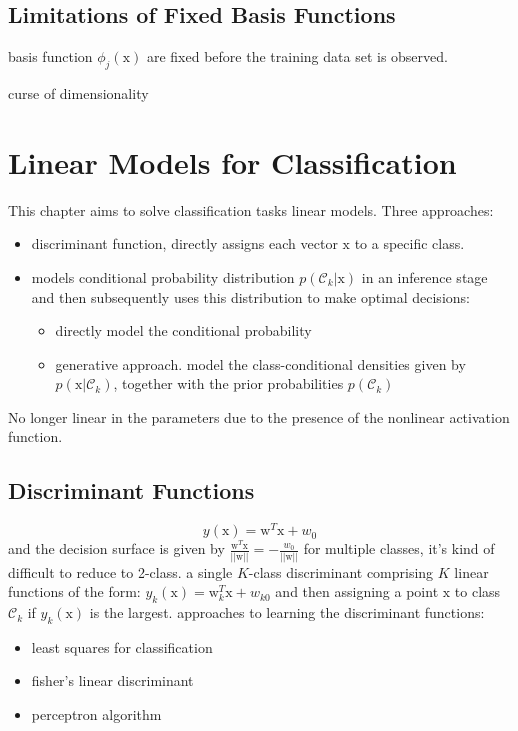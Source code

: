 \documentclass[a4paper]{book}
\begin{document}
\subsection{Limitations of Fixed Basis Functions}
basis function $\phi_j(\mathrm x)$ are fixed before the training data set is observed.\newline

curse of dimensionality




\section{Linear Models for Classification}
This chapter aims to solve classification tasks linear models.\newline
Three approaches:
\begin{itemize}
  \item discriminant function, directly assigns each vector $\mathrm x$ to a specific class.
  \item models conditional probability distribution $p(\mathcal C_k|\mathrm x)$ in an inference stage and then subsequently uses this distribution to make optimal decisions:
      \begin{itemize}
        \item directly model the conditional probability
        \item generative approach. model the class-conditional densities given by $p(\mathrm x|\mathcal C_k)$, together with the prior probabilities $p(\mathcal C_k)$
      \end{itemize}
\end{itemize}
No longer linear in the parameters due to the presence of the nonlinear activation function.
\subsection{Discriminant Functions}
$$y(\mathrm x) = \mathrm w^T\mathrm x+w_0$$
and the decision surface is given by $\frac{\mathrm w^T\mathrm x}{||\mathrm w||} = -\frac{w_0}{||\mathrm w||}$
for multiple classes,  it's kind of difficult to reduce to 2-class. a single $K$-class discriminant comprising $K$ linear functions of the form:
$y_k(\mathrm x) = \mathrm w_k^T\mathrm x+w_{k0}$ and then assigning a point $\mathrm x$ to class $\mathcal C_k$ if $y_k(\mathrm x)$ is the largest.\newline
approaches to learning the discriminant functions:
\begin{itemize}
  \item least squares for classification
  \item fisher's linear discriminant
  \item perceptron algorithm
\end{itemize}
\end{document}
